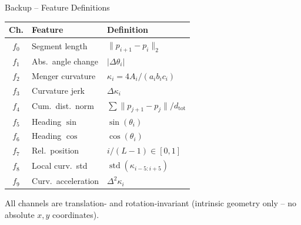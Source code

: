 \documentclass[aspectratio=169,10pt]{beamer}
\begin{document}
\begin{frame}{Backup -- Feature Definitions}
  \small
  \begin{tabular}{@{}clp{5.5cm}@{}}
    \toprule
    \textbf{Ch.} & \textbf{Feature} & \textbf{Definition} \\
    \midrule
    $f_0$ & Segment length      & $\|p_{i+1}-p_i\|_2$ \\
    $f_1$ & Abs.\ angle change  & $|\Delta\theta_i|$ \\
    $f_2$ & Menger curvature    & $\kappa_i=4A_i/(a_i b_i c_i)$ \\
    $f_3$ & Curvature jerk      & $\Delta\kappa_i$ \\
    $f_4$ & Cum.\ dist.\ norm   & $\sum\|p_{j+1}-p_j\|/d_\text{tot}$ \\
    $f_5$ & Heading $\sin$      & $\sin(\theta_i)$ \\
    $f_6$ & Heading $\cos$      & $\cos(\theta_i)$ \\
    $f_7$ & Rel.\ position      & $i/(L-1)\in[0,1]$ \\
    $f_8$ & Local curv.\ std    & $\operatorname{std}(\kappa_{i-5:i+5})$ \\
    $f_9$ & Curv.\ acceleration & $\Delta^2\kappa_i$ \\
    \bottomrule
  \end{tabular}
  \vspace{6pt}

  All channels are translation- and rotation-invariant (intrinsic geometry only -- no absolute $x,y$ coordinates).
\end{frame}
\end{document}
